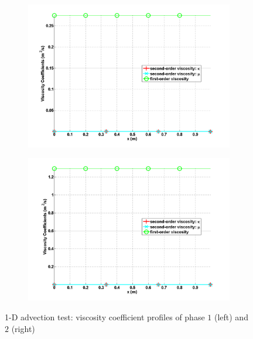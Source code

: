 %
\begin{figure}[H]
        \centering
        \begin{subfigure}[b]{0.495\textwidth}
                \centering
                \includegraphics[width=\textwidth]{figures/SEM/liquid_viscosity.png}
                \caption{\label{ig:visc-1-7-eqn-sect4}}
        \end{subfigure}%
        \begin{subfigure}[b]{0.495\textwidth}
                \centering
                \includegraphics[width=\textwidth]{figures/SEM/vapor_viscosity.png}
                \caption{\label{fig:visc-2-7-eqn-sect4}}
        \end{subfigure}
        \caption{1-D advection test: viscosity coefficient profiles of phase $1$ (left) and $2$ (right)\label{fig:visc-7-sect4}}
\end{figure}
